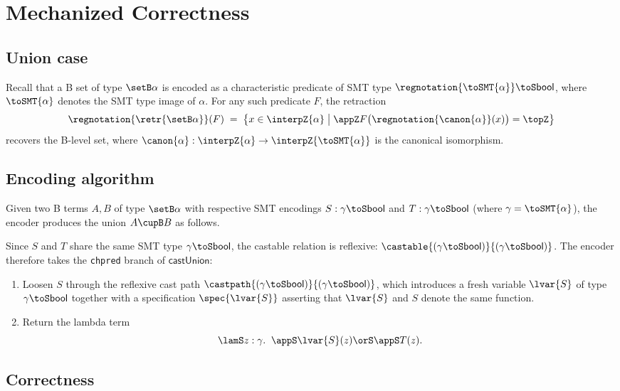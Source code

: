 \section{Mechanized Correctness}
\label{sec:beer-mechanized-correctness}

\subsection{Union case}
\label{sec:union-case}

Recall that a B set of type $\setB \alpha$ is encoded as a characteristic predicate of SMT type $\regnotation{\toSMT{\alpha}} \toS \mathsf{bool}$, where $\toSMT{\alpha}$ denotes the SMT type image of $\alpha$.
For any such predicate $F$, the retraction
\[
\regnotation{\retr{\setB \alpha}}(F) \;=\; \bigl\{ x \in \interpZ{\alpha} \;\big|\; \appZ F\bigl(\regnotation{\canon{\alpha}}(x)\bigr) = \topZ \bigr\}
\]
recovers the B-level set, where $\canon{\alpha} : \interpZ{\alpha} \to \interpZ{\toSMT{\alpha}}$ is the canonical isomorphism.

\subsection{Encoding algorithm}

Given two B terms $A, B$ of type $\setB \alpha$ with respective SMT encodings
$S : \gamma \toS \mathsf{bool}$ and $T : \gamma \toS \mathsf{bool}$
(where $\gamma = \toSMT{\alpha}$),
the encoder produces the union $A \cupB B$ as follows.

Since $S$ and $T$ share the same SMT type $\gamma \toS \mathsf{bool}$, the castable relation is reflexive: $\castable{(\gamma \toS \mathsf{bool})}{(\gamma \toS \mathsf{bool})}$.
The encoder therefore takes the \texttt{chpred} branch of $\mathsf{castUnion}$:
\begin{enumerate}
  \item Loosen $S$ through the reflexive cast path $\castpath{(\gamma \toS \mathsf{bool})}{(\gamma \toS \mathsf{bool})}$, which introduces a fresh variable $\lvar{S}$ of type $\gamma \toS \mathsf{bool}$ together with a specification $\spec{\lvar{S}}$ asserting that $\lvar{S}$ and $S$ denote the same function.
  \item Return the lambda term
  \[
    \lamS z : \gamma.\;\; \appS \lvar{S}(z) \orS \appS T(z).
  \]
\end{enumerate}

\subsection{Correctness}

